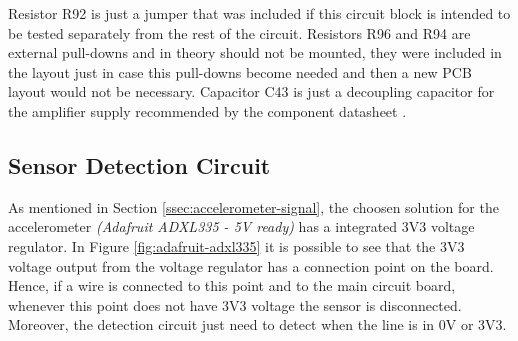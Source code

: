 	Resistor R92 is just a jumper that was included if this circuit block is intended to be tested separately from the rest of the circuit. Resistors R96 and R94 are external pull-downs and in theory should not be mounted, they were included in the layout just in case this pull-downs become needed and then a new PCB layout would not be necessary. Capacitor C43 is just a decoupling capacitor for the amplifier supply recommended by the component datasheet \cite{mcp6001-datasheet}.

\subsection{Sensor Detection Circuit}\label{ssec:accelerometer-sensor-detection-circuit}

	As mentioned in Section \ref{ssec:accelerometer-signal}, the choosen solution for the accelerometer \textit{(Adafruit ADXL335 - 5V ready)} has a integrated 3V3 voltage regulator. In Figure \ref{fig:adafruit-adxl335} it is possible to see that the 3V3 voltage output from the voltage regulator has a connection point on the board. Hence, if a wire is connected to this point and to the main circuit board, whenever this point does not have 3V3 voltage the sensor is disconnected. Moreover, the detection circuit just need to detect when the line is in 0V or 3V3.